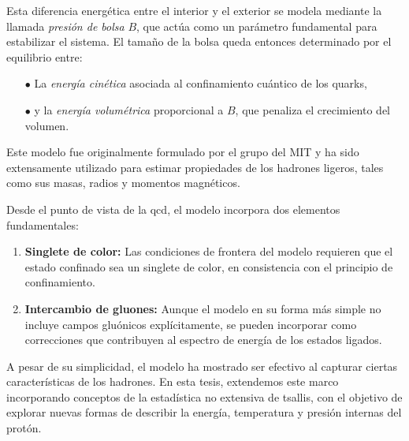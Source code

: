 Esta diferencia energética entre el interior y el exterior se modela mediante la llamada \emph{presión de bolsa} \( B \), que actúa como un parámetro fundamental para estabilizar el sistema. El tamaño de la bolsa queda entonces determinado por el equilibrio entre:

\begin{itemize}
    \item[$\bullet$] La \emph{energía cinética} asociada al confinamiento cuántico de los quarks,
    \item[$\bullet$] y la \emph{energía volumétrica} proporcional a \( B \), que penaliza el crecimiento del volumen.
\end{itemize}

Este modelo fue originalmente formulado por el grupo del MIT \cite{Chodos_1974} y ha sido extensamente utilizado para estimar propiedades de los hadrones ligeros, tales como sus masas, radios y momentos magnéticos.

Desde el punto de vista de la \gls{qcd}, el modelo incorpora dos elementos fundamentales:

\begin{enumerate}
    \item \textbf{Singlete de color:} Las condiciones de frontera del modelo requieren que el estado confinado sea un singlete de color, en consistencia con el principio de confinamiento.
    \item \textbf{Intercambio de gluones:} Aunque el modelo en su forma más simple no incluye campos gluónicos explícitamente, se pueden incorporar como correcciones que contribuyen al espectro de energía de los estados ligados.
\end{enumerate}

A pesar de su simplicidad, el modelo ha mostrado ser efectivo al capturar ciertas características de los hadrones. En esta tesis, extendemos este marco incorporando conceptos de la estadística no extensiva de \gls{tsallis}, con el objetivo de explorar nuevas formas de describir la energía, temperatura y presión internas del protón.